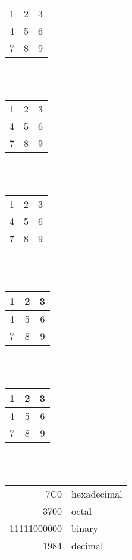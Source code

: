 \documentclass[12pt,a4paper]{article}
\begin{document}
  
  \begin{tabular}{ l c r }
    1 & 2 & 3 \\
    4 & 5 & 6 \\
    7 & 8 & 9 \\
  \end{tabular}

  ~\\~
  
  \begin{tabular}{ l | c | r }
    1 & 2 & 3 \\
    4 & 5 & 6 \\
    7 & 8 & 9 \\
  \end{tabular}
  
  ~\\~
  
  \begin{tabular}{ l | c | r }
    \hline			
    1 & 2 & 3 \\
    4 & 5 & 6 \\
    7 & 8 & 9 \\
    \hline  
  \end{tabular}
  
  ~\\~
  
  \begin{center}
    \begin{tabular}{ l | c | r }
      \hline
      1 & 2 & 3 \\ \hline
      4 & 5 & 6 \\ \hline
      7 & 8 & 9 \\
      \hline
    \end{tabular}
  \end{center}
  
  ~\\~
  
  \begin{center}
    \begin{tabular}{ | l | c | r }
      \hline
      1 & 2 & 3 \\ \hline
      4 & 5 & 6 \\ \hline
      7 & 8 & 9 \\
      \hline
    \end{tabular}
  \end{center}
  
  ~\\~
  
  \begin{tabular}{|r|l|}
    \hline
    7C0 & hexadecimal \\
    3700 & octal \\ \cline{2-2}
    11111000000 & binary \\
    \hline \hline
    1984 & decimal \\
    \hline
  \end{tabular}
  
\end{document}
